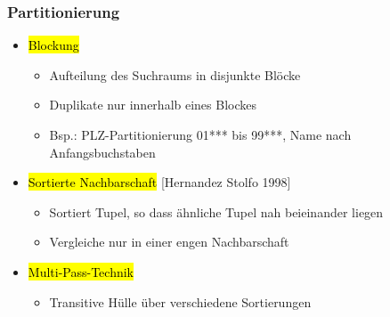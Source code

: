     
    
    \begin{frame}
    \frametitle{Partitionierung}
    
    \begin{itemize}
    \item \hl{Blockung}
    \begin{itemize}
    \item Aufteilung des Suchraums in disjunkte Blöcke
    \item Duplikate nur innerhalb eines Blockes 
    \item Bsp.: PLZ-Partitionierung 01*** bis 99***, Name nach Anfangsbuchstaben
    \end{itemize}
    \item \hl{Sortierte Nachbarschaft} [Hernandez Stolfo 1998]
    \begin{itemize}
    \item Sortiert Tupel, so dass ähnliche Tupel nah beieinander liegen
    \item Vergleiche nur in einer engen Nachbarschaft
    \end{itemize}
    \item \hl{Multi-Pass-Technik}
    \begin{itemize}
    \item Transitive Hülle über verschiedene Sortierungen
    \end{itemize}
    \end{itemize}
    
    \end{frame}
    
    
